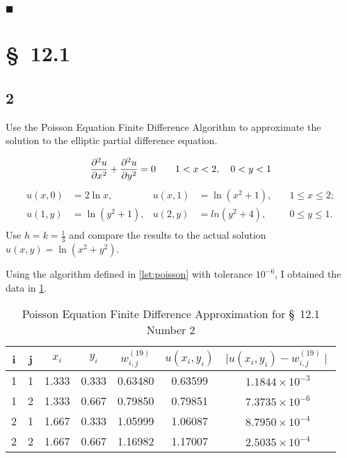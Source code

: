 \documentclass[12pt]{article}
\begin{document}
\hfill $\blacksquare$

\section{\S~12.1}
\subsection{2}
Use the Poisson Equation Finite Difference Algorithm to approximate
the solution to the elliptic partial difference equation.

\begin{equation*}
  \frac{\partial^2 u}{\partial x^2}+\frac{\partial^2 u}{\partial
    y^2}=0 \qquad 1<x<2,\quad 0<y<1 \\
\end{equation*}
\begin{equation*}
  \begin{aligned}
    u(x,0)&=2\ln x, &u(x,1)&=\ln(x^2+1),\quad &1\leq x\leq 2; \\
    u(1,y)&=\ln(y^2+1), &u(2,y)&=ln(y^2+4),\quad &0\leq y \leq 1. \\
  \end{aligned}
\end{equation*}
Use $h=k=\frac{1}{3}$ and compare the results to the actual solution
$u(x,y)=\ln(x^2+y^2)$.

\hfill

Using the algorithm defined in \cref{lst:poisson} with tolerance
$10^{-6}$, I obtained the data in \cref{tab:2}.
\begin{table}[h]
  \centering
  \begin{tabular}{ccccccc}
      \hline
      i & j & $x_i$ & $y_i$ & $w_{i,j}^{(19)}$ & $u(x_i,y_i)$ & $\mid
      u(x_i,y_i) - w_{i,j}^{(19)}\mid$ \\
      \hline
      1 & 1 & 1.333 & 0.333 & 0.63480 & 0.63599 & $1.1844 \times 10^{-3}$ \\
      1 & 2 & 1.333 & 0.667 & 0.79850 & 0.79851 & $7.3735 \times 10^{-6}$ \\
      2 & 1 & 1.667 & 0.333 & 1.05999 & 1.06087 & $8.7950 \times 10^{-4}$ \\
      2 & 2 & 1.667 & 0.667 & 1.16982 & 1.17007 & $2.5035 \times 10^{-4}$ \\
      \hline
  \end{tabular}
  \caption{Poisson Equation Finite Difference Approximation for
    \S~12.1 Number 2}
  \label{tab:2}
\end{table}
\end{document}

